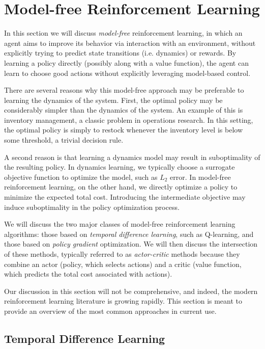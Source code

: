 \chapter{Model-free Reinforcement Learning}

In this section we will discuss \textit{model-free} reinforcement learning, in which an agent aims to improve its behavior via interaction with an environment, without explicitly trying to predict state transitions (i.e. dynamics) or rewards. 
By learning a policy directly (possibly along with a value function), the agent can learn to choose good actions without explicitly leveraging model-based control. 


There are several reasons why this model-free approach may be preferable to learning the dynamics of the system. First, the optimal policy may be considerably simpler than the dynamics of the system. An example of this is inventory management, a classic problem in operations research. In this setting, the optimal policy is simply to restock whenever the inventory level is below some threshold, a trivial decision rule. 

A second reason is that learning a dynamics model may result in suboptimality of the resulting policy. In dynamics learning, we typically choose a surrogate objective function to optimize the model, such as $L_2$ error. In model-free reinforcement learning, on the other hand, we directly optimize a policy to minimize the expected total cost. Introducing the intermediate objective may induce suboptimality in the policy optimization process. 

We will discuss the two major classes of model-free reinforcement learning algorithms: those based on \textit{temporal difference learning}, such as Q-learning, and those based on \textit{policy gradient} optimization. We will then discuss the intersection of these methods, typically referred to as \textit{actor-critic} methods because they combine an actor (policy, which selects actions) and a critic (value function, which predicts the total cost associated with actions). 

Our discussion in this section will not be comprehensive, and indeed, the modern reinforcement learning literature is growing rapidly. This section is meant to provide an overview of the most common approaches in current use. 

\section{Temporal Difference Learning}

